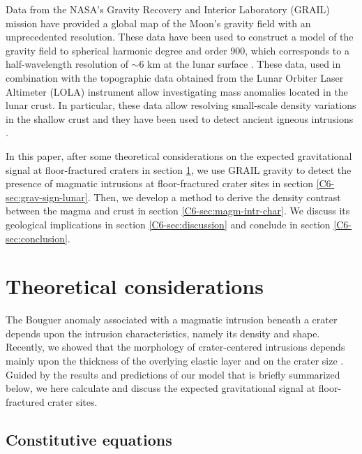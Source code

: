 Data from the NASA's Gravity  Recovery and Interior Laboratory (GRAIL)
mission have provided a global map of the Moon's gravity field with an
unprecedented resolution.   These data have  been used to  construct a
model of the gravity field to spherical harmonic degree and order 900,
which corresponds  to a half-wavelength  resolution of $\sim 6$  km at
the lunar  surface \citep{Zuber:2013cp,Konopliv:2014gm}.   These data,
used in combination with the  topographic data obtained from the Lunar
Orbiter  Laser Altimeter  (LOLA) instrument  allow investigating  mass
anomalies located in the lunar crust.  In particular, these data allow
resolving  small-scale   density  variations  in  the   shallow  crust
\citep{Besserer:2014jr,Wieczorek:2013ipa} and  they have been  used to
detect ancient igneous intrusions \citep{AndrewsHanna:2013ft}.

In this paper,  after some theoretical considerations  on the expected
gravitational   signal   at   floor-fractured   craters   in   section
\ref{C6-sec:theor-cons}, we use  GRAIL gravity to detect  the presence of
magmatic  intrusions  at  floor-fractured   crater  sites  in  section
\ref{C6-sec:grav-sign-lunar}.  Then,  we develop  a method to  derive the
density   contrast   between   the   magma  and   crust   in   section
\ref{C6-sec:magm-intr-char}.  We  discuss its geological  implications in
section     \ref{C6-sec:discussion}    and     conclude    in     section
\ref{C6-sec:conclusion}.

\section{Theoretical considerations}
\label{C6-sec:theor-cons}

The Bouguer  anomaly associated  with a  magmatic intrusion  beneath a
crater depends upon the  intrusion characteristics, namely its density
and shape.  Recently, we showed that the morphology of crater-centered
intrusions depends mainly upon the  thickness of the overlying elastic
layer and  on the  crater size  \citep{Thorey:2014cv}.  Guided  by the
results and predictions of our model that is briefly summarized below,
we here  calculate and  discuss the  expected gravitational  signal at
floor-fractured crater sites.

\subsection{Constitutive equations}
\label{C6-sec:const-equat-1}

